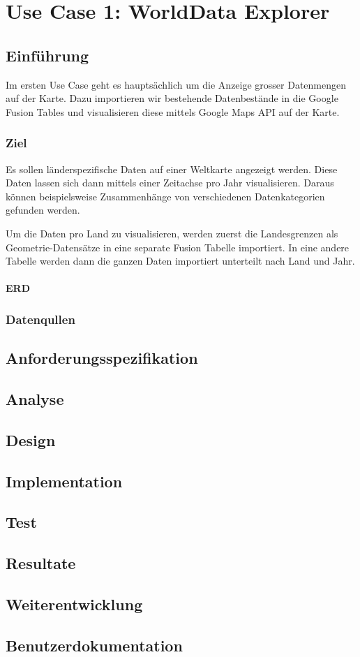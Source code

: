 \chapter{Use Case 1: WorldData Explorer}

\section{Einführung}
Im ersten Use Case geht es hauptsächlich um die Anzeige grosser Datenmengen auf der Karte. Dazu importieren wir bestehende Datenbestände in die Google Fusion Tables und visualisieren diese mittels Google Maps API auf der Karte.

\subsection{Ziel}
Es sollen länderspezifische Daten auf einer Weltkarte angezeigt werden. Diese Daten lassen sich dann mittels einer Zeitachse pro Jahr visualisieren. Daraus können beispielsweise Zusammenhänge von verschiedenen Datenkategorien gefunden werden.

Um die Daten pro Land zu visualisieren, werden zuerst die Landesgrenzen als Geometrie-Datensätze in eine separate Fusion Tabelle importiert. In eine andere Tabelle werden dann die ganzen Daten importiert unterteilt nach Land und Jahr.

\subsubsection{ERD}


\subsection{Datenqullen}

\section{Anforderungsspezifikation}

\section{Analyse}

\section{Design}

\section{Implementation}

\section{Test}

\section{Resultate}

\section{Weiterentwicklung}

\section{Benutzerdokumentation}